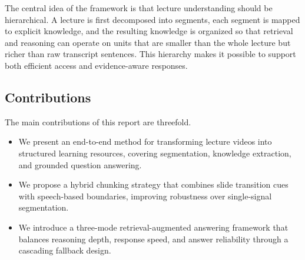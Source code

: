 The central idea of the framework is that lecture understanding should be hierarchical. A lecture is first decomposed into segments, each segment is mapped to explicit knowledge, and the resulting knowledge is organized so that retrieval and reasoning can operate on units that are smaller than the whole lecture but richer than raw transcript sentences. This hierarchy makes it possible to support both efficient access and evidence-aware responses.

\subsection{Contributions}

The main contributions of this report are threefold.

\begin{itemize}
\item We present an end-to-end method for transforming lecture videos into structured learning resources, covering segmentation, knowledge extraction, and grounded question answering.
\item We propose a hybrid chunking strategy that combines slide transition cues with speech-based boundaries, improving robustness over single-signal segmentation.
\item We introduce a three-mode retrieval-augmented answering framework that balances reasoning depth, response speed, and answer reliability through a cascading fallback design.
\end{itemize}